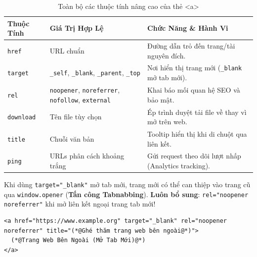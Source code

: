 \documentclass[11pt,oneside]{book}
\newcommand{\codeinline}[1]{\textcolor{accentOrange}{\texttt{#1}}}
\newcommand{\term}[1]{\textbf{\textcolor{primaryBlue}{#1}}}
\begin{document}
\begin{table}[H]
\centering
\begin{prettyTableBox}
\small
{}
\begin{tabularx}{\linewidth}{lp{3.5cm}X}
\rowcolor{primaryBlue}
\color{white}\textbf{Thuộc Tính} & \color{white}\textbf{Giá Trị Hợp Lệ} & \color{white}\textbf{Chức Năng \& Hành Vi} \\
\hline
\codeinline{href} & URL chuẩn & Đường dẫn trỏ đến trang/tài nguyên đích. \\
\codeinline{target} & \codeinline{\_self}, \codeinline{\_blank}, \codeinline{\_parent}, \codeinline{\_top} & Nơi hiển thị trang mới (\codeinline{\_blank} mở tab mới). \\
\codeinline{rel} & \codeinline{noopener}, \codeinline{noreferrer}, \codeinline{nofollow}, \codeinline{external} & Khai báo mối quan hệ SEO và bảo mật. \\
\codeinline{download} & Tên file tùy chọn & Ép trình duyệt tải file về thay vì mở trên web. \\
\codeinline{title} & Chuỗi văn bản & Tooltip hiển thị khi di chuột qua liên kết. \\
\codeinline{ping} & URLs phân cách khoảng trắng & Gửi request theo dõi lượt nhấp (Analytics tracking). \\
\end{tabularx}
\end{prettyTableBox}
\vspace{-2pt}
\caption{Toàn bộ các thuộc tính nâng cao của thẻ <a>}
\end{table}

\begin{warnBox}[Bảo Mật Với target="\_blank" \& rel="noopener noreferrer"]
Khi dùng \codeinline{target="\_blank"} mở tab mới, trang mới có thể can thiệp vào trang cũ qua \codeinline{window.opener} (\term{Tấn công Tabnabbing}). 
\textbf{Luôn bổ sung}: \codeinline{rel="noopener noreferrer"} khi mở liên kết ngoại trang tab mới!
\end{warnBox}

\begin{codeWindow}
\begin{lstlisting}[language=HTML5]
<a href="https://www.example.org" target="_blank" rel="noopener noreferrer" title="(*@Ghé thăm trang web bên ngoài@*)">
  (*@Trang Web Bên Ngoài (Mở Tab Mới)@*)
</a>
\end{lstlisting}
\end{codeWindow}
\end{document}
